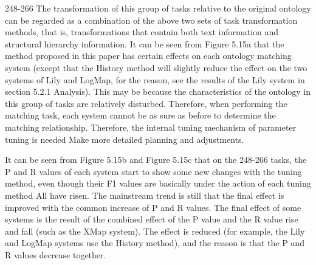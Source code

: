 \documentclass[twoside]{article}
\begin{document}
248-266 The transformation of this group of tasks relative to the original ontology can be regarded as a combination of the above two sets of task transformation methods, that is, transformations that contain both text information and structural hierarchy information.
It can be seen from Figure 5.15a that the method proposed in this paper has certain effects on each ontology matching system (except that the History method will slightly reduce the effect on the two systems of Lily and LogMap, for the reason, see the results of the Lily system in section 5.2.1 Analysis).
This may be because the characteristics of the ontology in this group of tasks are relatively disturbed. Therefore, when performing the matching task, each system cannot be as sure as before to determine the matching relationship. Therefore, the internal tuning mechanism of parameter tuning is needed Make more detailed planning and adjustments.

It can be seen from Figure 5.15b and Figure 5.15c that on the 248-266 tasks, the P and R values of each system start to show some new changes with the tuning method, even though their F1 values are basically under the action of each tuning method All have risen.
The mainstream trend is still that the final effect is improved with the common increase of P and R values. The final effect of some systems is the result of the combined effect of the P value and the R value rise and fall (such as the XMap system). The effect is reduced (for example, the Lily and LogMap systems use the History method), and the reason is that the P and R values decrease together.
\end{document}
